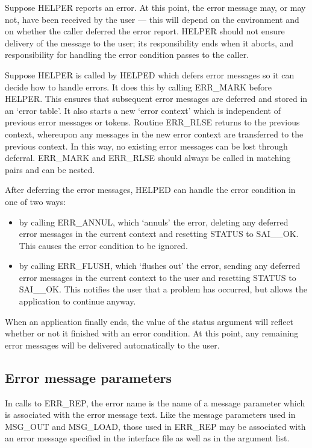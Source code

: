 Suppose HELPER reports an error.
At this point, the error message may, or may not, have been received by the
user --- this will depend on the environment and on whether the caller deferred
the error report. 
HELPER should not ensure delivery of the message to the user; its
responsibility ends when it aborts, and responsibility for handling the error
condition passes to the caller.

Suppose HELPER is called by HELPED which defers error messages so it can decide
how to handle errors.
It does this by calling ERR\_MARK before HELPER.
This ensures that subsequent error messages are deferred and stored in an
`error table'.
It also starts a new `error context' which is independent of previous error
messages or tokens.
Routine ERR\_RLSE returns to the previous context, whereupon any messages in
the new error context are transferred to the previous context.
In this way, no existing error messages can be lost through deferral.
ERR\_MARK and ERR\_RLSE should always be called in matching pairs and can
be nested.

After deferring the error messages, HELPED can handle the error condition 
in one of two ways:

\begin {itemize}
\item by calling ERR\_ANNUL, which `annuls' the error, deleting any deferred
 error messages in the current context and resetting STATUS to SAI\_\_OK.
 This causes the error condition to be ignored.
\item by calling ERR\_FLUSH, which `flushes out' the error, sending any
 deferred error messages in the current context to the user and 
 resetting STATUS to SAI\_\_OK. 
 This notifies the user that a problem has occurred, but allows the 
 application to continue anyway.
\end{itemize}

When an application finally ends, the value of the status argument will
reflect whether or not it finished with an error condition. 
At this point, any remaining error messages will be delivered automatically
to the user.

\subsection {Error message parameters}

In calls to ERR\_REP, the error name is the name of a
message parameter which is associated with the error message text.
Like the message parameters used in MSG\_OUT and MSG\_LOAD, those used in
ERR\_REP may be associated with an error message specified in the interface
file as well as in the argument list.
